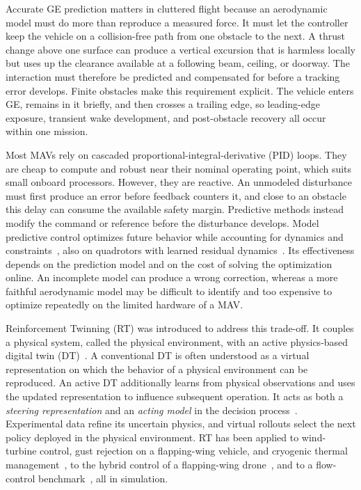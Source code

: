 \documentclass[journal]{IEEEtran}
\begin{document}
Accurate GE prediction matters in cluttered flight because an aerodynamic model must do more than reproduce a measured force. It must let the controller keep the vehicle on a collision-free path from one obstacle to the next. A thrust change above one surface can produce a vertical excursion that is harmless locally but uses up the clearance available at a following beam, ceiling, or doorway. The interaction must therefore be predicted and compensated for before a tracking error develops. Finite obstacles make this requirement explicit. The vehicle enters GE, remains in it briefly, and then crosses a trailing edge, so leading-edge exposure, transient wake development, and post-obstacle recovery all occur within one mission.

Most MAVs rely on cascaded proportional-integral-derivative (PID) loops. They are cheap to compute and robust near their nominal operating point, which suits small onboard processors. However, they are reactive. An unmodeled disturbance must first produce an error before feedback counters it, and close to an obstacle this delay can consume the available safety margin. Predictive methods instead modify the command or reference before the disturbance develops. Model predictive control optimizes future behavior while accounting for dynamics and constraints~\cite{MPCReview2021}, also on quadrotors with learned residual dynamics~\cite{Torrente2021}. Its effectiveness depends on the prediction model and on the cost of solving the optimization online. An incomplete model can produce a wrong correction, whereas a more faithful aerodynamic model may be difficult to identify and too expensive to optimize repeatedly on the limited hardware of a MAV.

Reinforcement Twinning (RT) was introduced to address this trade-off. It couples a physical system, called the physical environment, with an active physics-based digital twin (DT)~\cite{SchenaRT2023,Mendez2026,PolettiRT2025}. A conventional DT is often understood as a virtual representation on which the behavior of a physical environment can be reproduced. An active DT additionally learns from physical observations and uses the updated representation to influence subsequent operation. It acts as both a \emph{steering representation} and an \emph{acting model} in the decision process~\cite{Korenhof2021,Wagg2025}. Experimental data refine its uncertain physics, and virtual rollouts select the next policy deployed in the physical environment. RT has been applied to wind-turbine control, gust rejection on a flapping-wing vehicle, and cryogenic thermal management~\cite{SchenaRT2023}, to the hybrid control of a flapping-wing drone~\cite{PolettiRT2025}, and to a flow-control benchmark~\cite{Mendez2026}, all in simulation.
\end{document}
